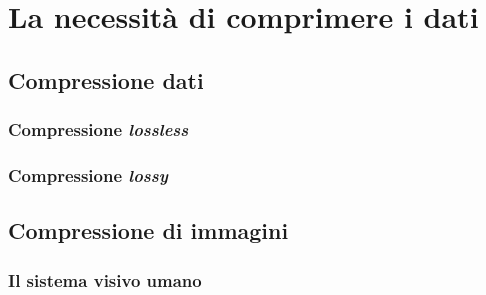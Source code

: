 
\chapter{La necessità di comprimere i dati} %

\label{Chapter3}



\section{Compressione dati}

\subsection{Compressione \emph{lossless}}


\subsection{Compressione \emph{lossy}}


\section{Compressione di immagini}


\subsection{Il sistema visivo umano}


